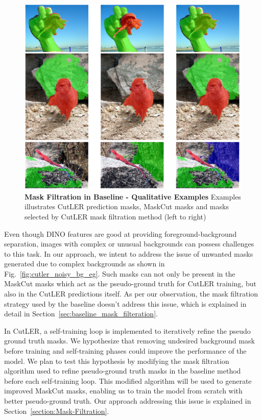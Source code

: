 \begin{figure}
	\centering
	\includegraphics[width=1\textwidth]{Images/main/filtered_mask_problem.png}
	\caption[\textbf{Mask Filtration in Baseline - Qualitative Examples}]{\textbf{Mask Filtration in Baseline - Qualitative Examples} Examples illustrates CutLER prediction masks, MaskCut masks and masks selected by CutLER mask filtration method (left to right)}
	\label{fig:filtered_mask_problem}
\end{figure}

Even though DINO features are good at providing foreground-background separation, images with complex or unusual backgrounds can possess challenges to this task. In our approach, we intent to address the issue of unwanted masks generated due to complex backgrounds as shown in Fig.~\ref{fig:cutler_noisy_bg_eg}. Such masks can not only be present in the MaskCut masks which act as the pseudo-ground truth for CutLER training, but also in the CutLER predictions itself. As per our observation, the mask filtration strategy used by the baseline doesn't address this issue, which is explained in detail in Section~\ref{sec:baseline_mask_filteration}.

In CutLER, a self-training loop is implemented to iteratively refine the pseudo ground truth masks. We hypothesize that removing undesired background mask before training and self-training phases could improve the performance of the model. We plan to test this hypothesis by modifying the mask filtration algorithm used to refine pseudo-ground truth masks in the baseline method before each self-training loop. This modified algorithm will be used to generate improved MaskCut masks, enabling us to train the model from scratch with better pseudo-ground truth. Our approach addressing this issue is explained in Section~\ref{section:Mask-Filtration}.

